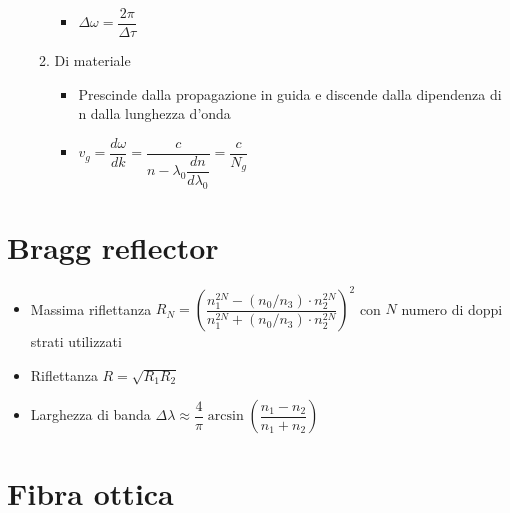 \documentclass{article}
\begin{document}
\begin{itemize}
\begin{enumerate}
\begin{itemize}
                  \item \( \Delta \omega = \dfrac{2 \pi}{\Delta \tau} \)
                \end{itemize}
          \item Di materiale
                \begin{itemize}
                  \item Prescinde dalla propagazione in guida e discende dalla dipendenza di n dalla lunghezza d'onda
                  \item \(  v_g = \dfrac{d \omega}{d k} = \dfrac{c}{n - \lambda_0 \dfrac{dn}{d \lambda_0}} = \dfrac{c}{N_g} \)
                \end{itemize}
        \end{enumerate}
\end{itemize}

\section{Bragg reflector}
\begin{itemize}
  \item Massima riflettanza \( R_N = \left(\dfrac{n_1^{2N} - (n_0 / n_3) \cdot n_2^{2N}}{n_1^{2N} + (n_0 / n_3) \cdot n_2^{2N}} \right) ^ 2 \) con \( N \) numero di doppi strati utilizzati
  \item Riflettanza \( \displaystyle R = \sqrt{R_1 R_2} \)
  \item Larghezza di banda \( \Delta \lambda \approx \dfrac{4}{\pi} \arcsin \left( \dfrac{n_1 - n_2}{n_1 + n_2} \right) \)
\end{itemize}

\section{Fibra ottica}
\end{document}

